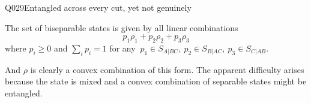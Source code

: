 \begin{entry}{Q029}{Entangled across every cut, yet not genuinely}
\begin{solution}[b)]
The set of biseparable states is given by all linear combinations $$p_1\rho_1 + p_2\rho_2 + p_3\rho_3$$
where
$ p_i\geq0$ and $\sum_i p_i =1$ for any $\ p_1 \in S_{A|BC},\ p_2 \in S_{B|AC},\ p_3 \in S_{C|AB}$.

And $\rho$ is clearly a convex combination of this form. The apparent difficulty arises because the state is mixed and a convex combination of separable states might be entangled.

    
\end{solution}


\begin{takeaway}
\end{takeaway}


\end{entry}
